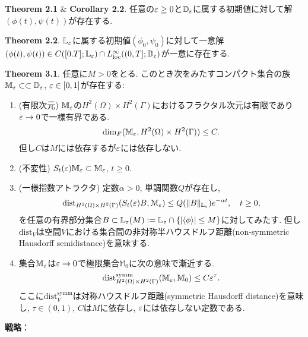 \documentclass[a4paper]{jsarticle}
\begin{document}
{\bf Theorem 2.1} \& {\bf Corollary 2.2}.
任意の$\varepsilon\geq 0$と$\mathbb{D}_{\varepsilon}$に属する初期値に対して解$(\phi(t),\psi(t))$が存在する.

{\bf Theorem 2.2}.
$\mathbb{L}_{\varepsilon}$に属する初期値$(\phi_0,\psi_0)$に対して一意解$(\phi(t),\psi(t))\in C([0.T];\mathbb{L}_{\varepsilon}) \cap L^{\infty}_{\text{loc}}((0,T];\mathbb{D}_{\varepsilon})$が一意に存在する.

{\bf Theorem 3.1}.
任意に$M>0$をとる.
このとき次をみたすコンパクト集合の族$\mathbb{M}_{\varepsilon}\subset\subset \mathbb{D}_{\varepsilon}$, $\varepsilon\in[0,1]$が存在する:
\begin{enumerate}
	\item (有限次元) $\mathbb{M}_{\varepsilon}$の$H^2(\Omega)\times H^2(\Gamma)$におけるフラクタル次元は有限であり$\varepsilon\to 0$で一様有界である.
	\begin{equation}
		\dim_F(\mathbb{M}_{\varepsilon}, H^2(\Omega)\times H^2(\Gamma))\leq C.
	\end{equation}
	但し$C$は$M$には依存するが$\varepsilon$には依存しない.
	\item (不変性) $S_t(\varepsilon)\mathbb{M}_{\varepsilon} \subset \mathbb{M}_{\varepsilon}$, $t\geq 0$.
	\item (一様指数アトラクタ) 定数$\alpha>0$, 単調関数$Q$が存在し,
	\begin{equation}
		\mathrm{dist}_{H^2(\Omega)\times H^2(\Gamma)}(S_t(\varepsilon)B, \mathcal{M}_{\varepsilon}) \leq Q(\| B\|_{\mathbb{L}_{\varepsilon}})e^{-\alpha t},\quad t\geq 0,
	\end{equation}
	を任意の有界部分集合$B\subset \mathbb{L}_{\varepsilon}(M):=\mathbb{L}_{\varepsilon} \cap \{|\langle\phi\rangle|\leq M\}$に対してみたす.
	但し$\mathrm{dist}_V$は空間$V$における集合間の非対称半ハウスドルフ距離(non-symmetric Hausdorff semidistance)を意味する.
	\item 集合$\mathbb{M}_{\varepsilon}$は$\varepsilon\to 0$で極限集合$\mathbb{M}_0$に次の意味で漸近する.
	\begin{equation}
		\mathrm{dist}_{H^2(\Omega)\times H^2(\Gamma)}^{\text{symm}}(\mathbb{M}_{\varepsilon},\mathbb{M}_0)\leq C\varepsilon^{\tau}.
	\end{equation}
	ここに$\mathrm{dist}_V^{\text{symm}}$は対称ハウスドルフ距離(symmetric Hausdorff distance)を意味し, $\tau\in (0,1)$, $C$は$M$に依存し, $\varepsilon$には依存しない定数である.
\end{enumerate}

{\bf 戦略}：



\newpage
\end{document}
